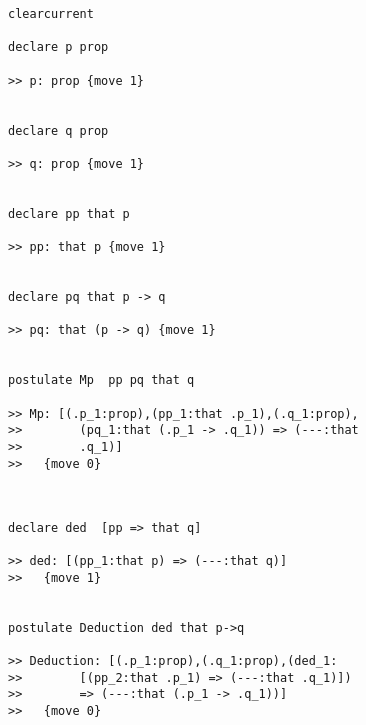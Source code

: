 \documentclass[12pt]{slides}
\begin{document}
\begin{slide}

{\tiny

\begin{verbatim}
clearcurrent

declare p prop

>> p: prop {move 1}


declare q prop

>> q: prop {move 1}


declare pp that p

>> pp: that p {move 1}


declare pq that p -> q

>> pq: that (p -> q) {move 1}


postulate Mp  pp pq that q

>> Mp: [(.p_1:prop),(pp_1:that .p_1),(.q_1:prop),
>>        (pq_1:that (.p_1 -> .q_1)) => (---:that 
>>        .q_1)]
>>   {move 0}

\end{verbatim}
}

\end{slide}

\begin{slide}
{\tiny
\begin{verbatim}


declare ded  [pp => that q]

>> ded: [(pp_1:that p) => (---:that q)]
>>   {move 1}


postulate Deduction ded that p->q

>> Deduction: [(.p_1:prop),(.q_1:prop),(ded_1:
>>        [(pp_2:that .p_1) => (---:that .q_1)])
>>        => (---:that (.p_1 -> .q_1))]
>>   {move 0}


\end{verbatim}

}

\end{slide}
\end{document}
